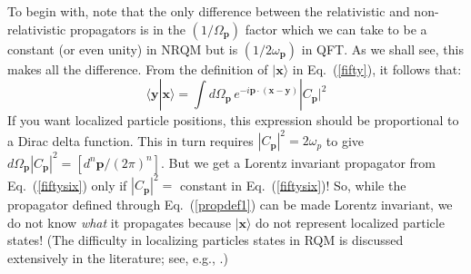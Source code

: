 \documentclass[12pt]{article}
\def\eq#1{{Eq.~(\ref{#1})}}
\def\ket#1{|#1\rangle}                    %
\def\amp#1#2{\langle #1 | #2\rangle}      %
\begin{document}
To begin with, note that the only difference between the relativistic and non-relativistic propagators is in the  $(1/\Omega_{\bm{p}})$ factor which we can take to be a constant (or even unity) in NRQM but is $(1/2\omega_{\bm{p}})$ in QFT. As we shall see, this makes all the difference.
 From the definition of $\ket{\bm{x}}$ in \eq{fifty}, it follows that:
 \begin{equation}
  \amp{\bm{y}}{\bm{x}} = \int d\Omega_{\bm{p}}  \, e^{-i\bm{p \cdot (x-y)}} |C_{\bm {p}}|^2
  \label{fiftytwo1}
\end{equation} 
If you want localized particle positions, this expression should be proportional to a Dirac delta function. This in turn requires $|C_{\bm {p}}|^2=2\omega_p$ to give $d\Omega_{\bm{p}}|C_{\bm {p}}|^2=[d^n\bm{p}/(2\pi)^n]$. But we get a Lorentz invariant propagator from \eq{fiftysix} only if $|C_{\bm {p}}|^2=$ constant in \eq{fiftysix}! So, while the propagator defined through \eq{propdef1} can be made Lorentz invariant, we do not know \textit{what} it propagates because $\ket{\bm{x}}$ do not represent localized particle states! (The difficulty in localizing particles states in RQM is discussed extensively in the literature; see, e.g., \cite{F,F12,F13,F14,F15}.)
\end{document}
